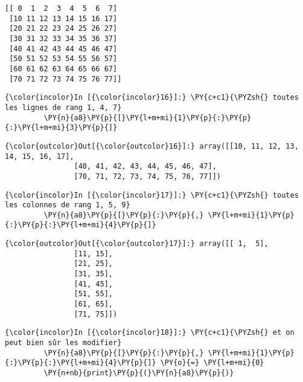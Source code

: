     \begin{Verbatim}[commandchars=\\\{\},frame=single,framerule=0.3mm,rulecolor=\color{cellframecolor}]
[[ 0  1  2  3  4  5  6  7]
 [10 11 12 13 14 15 16 17]
 [20 21 22 23 24 25 26 27]
 [30 31 32 33 34 35 36 37]
 [40 41 42 43 44 45 46 47]
 [50 51 52 53 54 55 56 57]
 [60 61 62 63 64 65 66 67]
 [70 71 72 73 74 75 76 77]]
\end{Verbatim}

    \begin{Verbatim}[commandchars=\\\{\},frame=single,framerule=0.3mm,rulecolor=\color{cellframecolor}]
{\color{incolor}In [{\color{incolor}16}]:} \PY{c+c1}{\PYZsh{} toutes les lignes de rang 1, 4, 7}
         \PY{n}{a8}\PY{p}{[}\PY{l+m+mi}{1}\PY{p}{:}\PY{p}{:}\PY{l+m+mi}{3}\PY{p}{]}
\end{Verbatim}


\begin{Verbatim}[commandchars=\\\{\},frame=single,framerule=0.3mm,rulecolor=\color{cellframecolor}]
{\color{outcolor}Out[{\color{outcolor}16}]:} array([[10, 11, 12, 13, 14, 15, 16, 17],
                [40, 41, 42, 43, 44, 45, 46, 47],
                [70, 71, 72, 73, 74, 75, 76, 77]])
\end{Verbatim}
            
    \begin{Verbatim}[commandchars=\\\{\},frame=single,framerule=0.3mm,rulecolor=\color{cellframecolor}]
{\color{incolor}In [{\color{incolor}17}]:} \PY{c+c1}{\PYZsh{} toutes les colonnes de rang 1, 5, 9}
         \PY{n}{a8}\PY{p}{[}\PY{p}{:}\PY{p}{,} \PY{l+m+mi}{1}\PY{p}{:}\PY{p}{:}\PY{l+m+mi}{4}\PY{p}{]}
\end{Verbatim}


\begin{Verbatim}[commandchars=\\\{\},frame=single,framerule=0.3mm,rulecolor=\color{cellframecolor}]
{\color{outcolor}Out[{\color{outcolor}17}]:} array([[ 1,  5],
                [11, 15],
                [21, 25],
                [31, 35],
                [41, 45],
                [51, 55],
                [61, 65],
                [71, 75]])
\end{Verbatim}
            
    \begin{Verbatim}[commandchars=\\\{\},frame=single,framerule=0.3mm,rulecolor=\color{cellframecolor}]
{\color{incolor}In [{\color{incolor}18}]:} \PY{c+c1}{\PYZsh{} et on peut bien sûr les modifier}
         \PY{n}{a8}\PY{p}{[}\PY{p}{:}\PY{p}{,} \PY{l+m+mi}{1}\PY{p}{:}\PY{p}{:}\PY{l+m+mi}{4}\PY{p}{]} \PY{o}{=} \PY{l+m+mi}{0}
         \PY{n+nb}{print}\PY{p}{(}\PY{n}{a8}\PY{p}{)}
\end{Verbatim}


